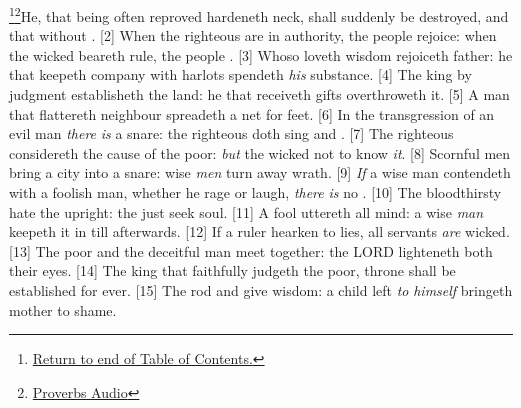 \footnote{\textcolor[cmyk]{0.99998,1,0,0}{\hyperlink{TOC}{Return to end of Table of Contents.}}}\footnote{\href{https://www.audioverse.org/english/audiobibles/books/ENGKJV/O/Prov/1}{\textcolor[cmyk]{0.99998,1,0,0}{Proverbs Audio}}}\textcolor[cmyk]{0.99998,1,0,0}{He, that being often reproved hardeneth  neck, shall suddenly be destroyed, and that without .}
[2] \textcolor[cmyk]{0.99998,1,0,0}{When the righteous are in authority, the people rejoice:  when the wicked beareth rule, the people .}
[3] \textcolor[cmyk]{0.99998,1,0,0}{Whoso loveth wisdom rejoiceth  father:  he that keepeth company with harlots spendeth \emph{his} substance.}
[4] \textcolor[cmyk]{0.99998,1,0,0}{The king by judgment establisheth the land:  he that receiveth gifts overthroweth it.}
[5] \textcolor[cmyk]{0.99998,1,0,0}{A man that flattereth  neighbour spreadeth a net for  feet.}
[6] \textcolor[cmyk]{0.99998,1,0,0}{In the transgression of an evil man \emph{there} \emph{is} a snare:  the righteous doth sing and .}
[7] \textcolor[cmyk]{0.99998,1,0,0}{The righteous considereth the cause of the poor: \emph{but} the wicked  not to know \emph{it}.}
[8] \textcolor[cmyk]{0.99998,1,0,0}{Scornful men bring a city into a snare:  wise \emph{men} turn away wrath.}
[9] \textcolor[cmyk]{0.99998,1,0,0}{\emph{If} a wise man contendeth with a foolish man, whether he rage or laugh, \emph{there} \emph{is} no .}
[10] \textcolor[cmyk]{0.99998,1,0,0}{The bloodthirsty hate the upright:  the just seek  soul.}
[11] \textcolor[cmyk]{0.99998,1,0,0}{A fool uttereth all  mind:  a wise \emph{man} keepeth it in till afterwards.}
[12] \textcolor[cmyk]{0.99998,1,0,0}{If a ruler hearken to lies, all  servants \emph{are} wicked.}
[13] \textcolor[cmyk]{0.99998,1,0,0}{The poor and the deceitful man meet together: the LORD lighteneth both their eyes.}
[14] \textcolor[cmyk]{0.99998,1,0,0}{The king that faithfully judgeth the poor,  throne shall be established for ever.}
[15] \textcolor[cmyk]{0.99998,1,0,0}{The rod and  give wisdom:  a child left \emph{to} \emph{himself} bringeth  mother to shame.}
